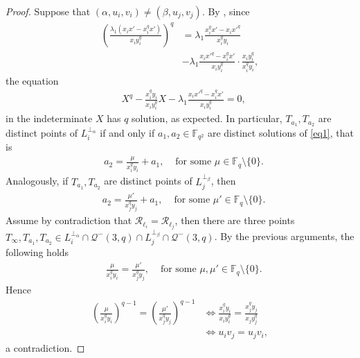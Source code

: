 \documentclass[11pt]{article}
\theoremstyle{definition}
\numberwithin{equation}{section}
\def\cQ{\mathcal Q}
\def\cR{\mathcal R}
\def\F{{\mathbb F}}
\begin{document}
\begin{proof}
Suppose that $(\alpha, u_i, v_i) \ne (\beta, u_{j}, v_{j})$. By \cite[Corollary 1.24]{hirschfeld1998projective}, since 
\begin{align*}
\left(\frac{\lambda_1 \left(x_i x' - x_i^q x'\right)}{x_i y_i^q}\right)^q & = \lambda_1 \frac{x_i^q x' - x_i x'^q}{x_i^q y_i} \\
& - \lambda_1 \frac{x_i x'^q - x_i^q x'}{x_i y_i^q} \cdot \frac{x_i y_i^q}{x_i^q y_i},
\end{align*}
the equation
\begin{align}
& X^q - \frac{x_i^q y_i}{x_i y_i^q} X - \lambda_1 \frac{x_i x'^q - x_i^q x'}{x_i y_i^q} = 0, \label{eq1}
\end{align}
in the indeterminate $X$ has $q$ solution, as expected. In particular, $T_{a_1}, T_{a_2}$ are distinct points of $L_i^{\perp_{\alpha}}$ if and only if $a_1, a_2 \in \F_{q^2}$ are distinct solutions of \eqref{eq1}, that is 
\begin{align*}
& a_2 = \frac{\mu}{x_i^q y_i} + a_1, & \mbox{ for some } \mu \in \F_q \setminus \{0\}.
\end{align*}
Analogously, if $T_{a_1}, T_{a_2}$ are distinct points of $L_{j}^{\perp_{\beta}}$, then 
\begin{align*}
& a_2 = \frac{\mu'}{x_{j}^q y_{j}} + a_1, & \mbox{ for some } \mu' \in \F_q \setminus \{0\}.
\end{align*}
Assume by contradiction that $\cR_{\ell_i} = \cR_{\ell_j}$, then there are three points $T_{\infty}, T_{a_1}, T_{a_2} \in L_i^{\perp_{\alpha}} \cap \cQ^-(3, q) \cap L_{j}^{\perp_{\beta}} \cap \cQ^-(3, q)$. By the previous arguments, the following holds
\begin{align*}
& \frac{\mu}{x_i^q y_i} = \frac{\mu'}{x_{j}^q y_{j}}, & \mbox{ for some } \mu, \mu' \in \F_q \setminus \{0\}.
\end{align*}
Hence 
\begin{align*}
\left(\frac{\mu}{x_i^q y_i}\right)^{q-1} = \left(\frac{\mu'}{x_{j}^q y_{j}}\right)^{q-1} & \iff \frac{x_i^q y_i}{x_i y_i^q} = \frac{x_{j}^q y_{j}}{x_{j} y_{j}^q} \\
& \iff u_i v_{j} =  u_{j} v_i,
\end{align*}
a contradiction.
\end{proof}
\end{document}
